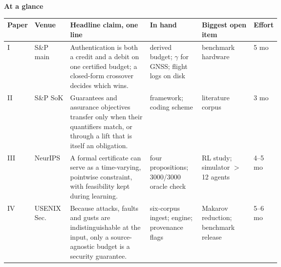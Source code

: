 \documentclass[10pt,a4paper]{article}
\begin{document}
\vspace{4pt}
{\large\bfseries\color{netcol} At a glance}\par\vspace{2pt}
\renewcommand{\arraystretch}{1.18}
\begin{tabularx}{\linewidth}{@{}P{0.07\linewidth}P{0.13\linewidth}YP{0.19\linewidth}P{0.19\linewidth}P{0.07\linewidth}@{}}
\toprule
\textbf{Paper} & \textbf{Venue} & \textbf{Headline claim, one line} &
\textbf{In hand} & \textbf{Biggest open item} & \textbf{Effort} \\
\midrule
I   & S\&P main &
Authentication is both a credit and a debit on one certified budget; a
closed-form crossover decides which wins. &
derived budget; $\gamma$ for GNSS; flight logs on disk &
benchmark hardware & 5 mo \\
II  & S\&P SoK &
Guarantees and assurance objectives transfer only when their quantifiers
match, or through a lift that is itself an obligation. &
framework; coding scheme &
literature corpus & 3 mo \\
III & NeurIPS &
A formal certificate can serve as a time-varying, pointwise constraint, with
feasibility kept during learning. &
four propositions; 3000/3000 oracle check &
RL study; simulator $>$12 agents & 4--5 mo \\
IV  & USENIX Sec. &
Because attacks, faults and gusts are indistinguishable at the input, only a
source-agnostic budget is a security guarantee. &
six-corpus ingest; engine; provenance flags &
Makarov reduction; benchmark release & 5--6 mo \\
\bottomrule
\end{tabularx}
\end{document}
